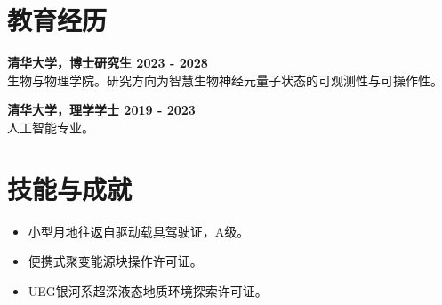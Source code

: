 \documentclass[10pt]{resume}
\begin{document}
\section{教育经历}
\textbf{清华大学，博士研究生 \hfill 2023 - 2028} \\
生物与物理学院。研究方向为智慧生物神经元量子状态的可观测性与可操作性。

\textbf{清华大学，理学学士 \hfill 2019 - 2023} \\
人工智能专业。

\section{技能与成就}
\begin{itemize}
    \item 小型月地往返自驱动载具驾驶证，A级。
    \item 便携式聚变能源块操作许可证。
    \item UEG银河系超深液态地质环境探索许可证。
\end{itemize}
\end{document}
